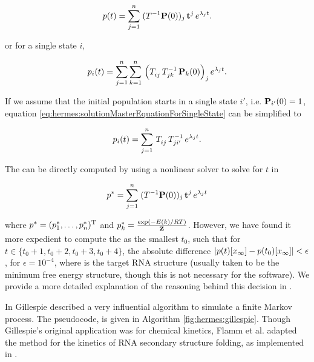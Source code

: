 \begin{align}
\label{eq:hermes:solutionMasterEquation}
p(t) = \sum_{j=1}^n\; (T^{-1}
\mathbbP(0))_j\, \mathbbt^j\, e^{\lambda_j t}.
\end{align}

or for a single state $i$,

\begin{align}
\label{eq:hermes:solutionMasterEquationForSingleState}
p_i(t) = \sum_{j=1}^n \sum_{k=1}^n\, \left(
T_{ij}^{\vphantom{-1}}\, T_{jk}^{-1}\, \mathbbP_k(0)
\right)_j e^{\lambda_j t}.
\end{align}

If we assume that the initial population starts in a single state $i'$,
i.e. $\mbox{\bf P}_{i'}(0) = 1$, equation
\ref{eq:hermes:solutionMasterEquationForSingleState} can be simplified to

\begin{align}
\label{eq:hermes:solutionMasterEquationForSingleStateFixedStartPop}
p_i(t) = \sum_{j=1}^n\, T_{ij}^{\vphantom{-1}}\, T_{ji'}^{-1}\, e^{\lambda_j t}.
\end{align}

The {\em \eqt} can be directly computed by using a
nonlinear solver to solve for $t$ in

\begin{align}
\label{eq:hermes:solutionEquilibriumTime}
\pSt = \sum_{j=1}^n\; (T^{-1}
\mathbbP(0))_j\, \mathbbt^j\, e^{\lambda_j t}
\end{align}

where $p^*=(p^*_1,\dots,p^*_n)^{\text T}$ and $p^*_k = \frac{\exp(-E(k)/RT)}{{\bf Z}^{}_{}}$.
However, we have found it more
expedient to compute the {\em \eqt} as the smallest $t_0$,
such that for $t \in \{t_0+1,t_0+2,t_0+3,t_0+4\}$, the absolute difference
$|p(t)[x_\infty] - p(t_0)[x_\infty]| < \epsilon$, for $\epsilon =
10^{-4}$, where \xEnd is the target RNA structure (usually taken
to be the minimum free energy structure, though this is not necessary for
the software). We provide a more detailed explanation of the reasoning behind
this decision in .

In \citep{gillespiestochasticsimulation1} Gillespie described
a very influential algorithm to simulate a finite Markov process.
The pseudocode, is given in Algorithm \ref{fig:hermes:gillespie}.
Though Gillespie's original application was for chemical kinetics,
Flamm et al. adapted the method for the kinetics of RNA secondary structure
folding, as implemented in \kinfold \citep{flammphd,flamm}.
\medskip

